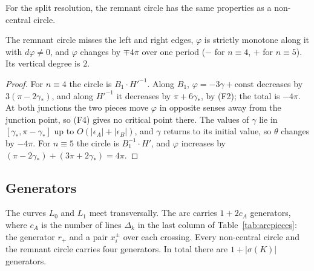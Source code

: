 For the split resolution, the remnant circle has the same properties as a non-central circle.

\begin{lemma}\label{lem:remnant}
The remnant circle misses the left and right edges, $\varphi$ is strictly monotone along it with $d\varphi\neq0$, and
$\varphi$ changes by $\mp4\pi$ over one period ($-$ for $n\equiv4$, $+$ for $n\equiv5$). Its vertical degree is $2$.
\end{lemma}

\begin{proof}
For $n\equiv4$ the circle is $B_1\cdot H'^{-1}$. Along $B_1$, $\varphi=-3\gamma+\mathrm{const}$ decreases by $3(\pi-2\gamma_*)$, and
along $H'^{-1}$ it decreases by $\pi+6\gamma_*$, by (F2); the total is $-4\pi$. At both junctions the two pieces move
$\varphi$ in opposite senses away from the junction point, so (F4) gives no critical point there. The values of
$\gamma$ lie in $[\gamma_*,\pi-\gamma_*]$ up to $O(|\epsilon_A|+|\epsilon_B|)$, and $\gamma$ returns to its initial value, so $\theta$ changes by
$-4\pi$. For $n\equiv5$ the circle is $B_1^{-1}\cdot H'$, and $\varphi$ increases by $(\pi-2\gamma_*)+(3\pi+2\gamma_*)=4\pi$.
\end{proof}

\subsection{Generators}\label{ss:generators}

\begin{proposition}\label{prop:generators}
The curves $L_0$ and $L_1$ meet transversally. The arc carries $1+2c_A$ generators, where $c_A$ is the
number of lines $\Delta_k$ in the last column of Table~\ref{tab:arcpieces}: the generator $r_+$ and a pair
$x_i^\pm$ over each crossing. Every non-central circle and the remnant circle carries four generators. In total
there are $1+|\sigma(K)|$ generators.
\end{proposition}

